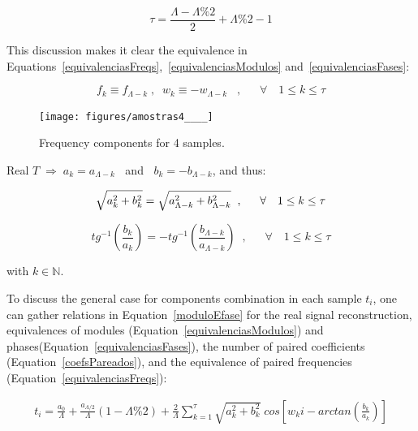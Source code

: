 \begin{equation}\label{coefsPareados}
\tau = \frac{\Lambda - \Lambda \% 2}{2} +\Lambda \% 2 -1
\end{equation}

This discussion makes it clear the equivalence in Equations~\ref{equivalenciasFreqs},~\ref{equivalenciasModulos} and~\ref{equivalenciasFases}:

\begin{equation}\label{equivalenciasFreqs}
f_{k}\equiv f_{\Lambda-k}\;, \;\; w_{k}\equiv-w_{\Lambda-k}\;\;\;, \quad \;\; \forall \quad 1 \leq k \leq \tau  
\end{equation}

\begin{figure}
    \centering
        \texttt{[image: figures/amostras4\_\_\_\_]}
    \caption{Frequency components for 4 samples.}
        \label{fig:amostras4}
\end{figure}

Real $T \; \Rightarrow \; a_k = a_{\Lambda -k}\;\;$ and $\;\;b_k = - b_{\Lambda -k}$, and thus:

\begin{equation}\label{equivalenciasModulos}
\sqrt{a_k^2 + b_k^2} = \sqrt{a_{\Lambda - k}^2 + b_{\Lambda -k}^2} \;\;, \quad \;\; \forall \quad 1 \leq k \leq \tau  \\
\end{equation}

\begin{equation}\label{equivalenciasFases}
tg^{-1}\left(\frac{b_k}{a_k}\right)=-tg^{-1}\left(\frac{b_{\Lambda -k}}{a_{\Lambda - k}}\right)\;\;,\quad \;\; \forall \quad 1 \leq k \leq \tau
\end{equation}

\noindent with $k \in \mathbb{N}$.

To discuss the general case for components combination in each sample $t_i$, one can gather relations in Equation~\ref{moduloEfase} for the real signal reconstruction, equivalences of modules (Equation~\ref{equivalenciasModulos}) and phases(Equation~\ref{equivalenciasFases}), the number of paired coefficients (Equation~\ref{coefsPareados}), and the equivalence of paired frequencies (Equation~\ref{equivalenciasFreqs}):

\begin{equation}\label{eq:reconsCompleta}
\begin{split}
	t_i = \frac{a_0}{\Lambda} + \frac{ a_{\Lambda/2}}{\Lambda}(1-\Lambda\% 2) + \frac{2}{\Lambda}\sum_{k=1}^{\tau}\sqrt{a_k^2 + b_k^2} \; cos\left[w_k i - arctan\left(\frac{b_k}{a_k}\right)\right]
\end{split}
\end{equation}

